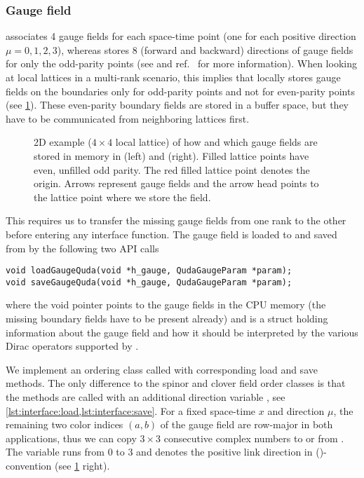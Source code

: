 \subsubsection{Gauge field}

\Quda associates \num{4} gauge fields for each space-time point (one for each positive direction $\mu=0,1,2,3$), whereas \openqxd stores \num{8} (forward and backward) directions of gauge fields for only the odd-parity points (see  and ref.~\cite{openqxd} for more information). When looking at local lattices in a multi-rank scenario, this implies that \openqxd locally stores gauge fields on the boundaries only for odd-parity points and not for even-parity points (see \cref{fig:gauge}). These even-parity boundary fields are stored in a buffer space, but they have to be communicated from neighboring lattices first.
\begin{figure}
  \caption{2D example ($4 \times 4$ local lattice) of how and which gauge fields are stored in memory in \openqxd (left) and \quda (right). Filled lattice points have even, unfilled odd parity. The red filled lattice point denotes the origin. Arrows represent gauge fields and the arrow head points to the lattice point where we store the field.}
  \label{fig:gauge}
\end{figure}

This requires us to transfer the missing gauge fields from one rank to the other before entering any \quda interface function. The gauge field is loaded to and saved from \quda by the following two API calls
\begin{verbatim}
void loadGaugeQuda(void *h_gauge, QudaGaugeParam *param);
void saveGaugeQuda(void *h_gauge, QudaGaugeParam *param);
\end{verbatim}
where the void pointer  points to the gauge fields in the CPU memory (the missing boundary fields have to be present already) and  is a struct holding information about the gauge field and how it should be interpreted by the various Dirac operators supported by \quda.

We implement an ordering class called  with corresponding load and save methods.
The only difference to the spinor and clover field order classes is that the methods are called with an additional direction variable , see \cref{lst:interface:load,lst:interface:save}.
For a fixed space-time $x$ and direction $\mu$, the remaining two color indices $(a,b)$ of the gauge field are row-major in both applications, thus we can copy $3\times 3$ consecutive complex numbers to or from .
The variable  runs from $0$ to $3$ and denotes the positive link direction in \qudas (\xyzt)-convention (see \cref{fig:gauge} right).

